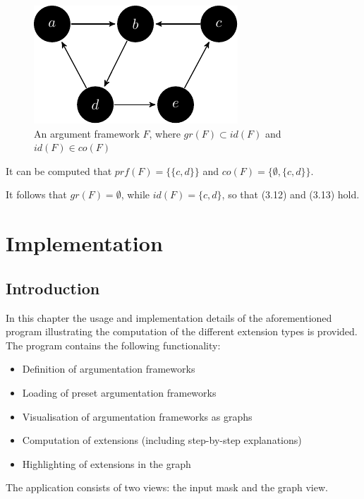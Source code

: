 \documentclass[draft,final]{vutinfth} %
\newcommand{\hl}{\par\vspace{6pt}} %
\newcommand{\cl}{\par\vspace{12pt}} %
\begin{document}
\FloatBarrier
	\begin{figure}[!h]
		\centering
		\includegraphics[scale=1.5]{graphs/ex6.pdf}
		\caption{An argument framework $F$, where $gr(F)\subset id(F)$ and $id(F)\in co(F)$}
	\end{figure}
\FloatBarrier

It can be computed that $prf(F)=\{\{c,d\}\}$ and $co(F)=\{\emptyset,\{c,d\}\}$.\hl
It follows that $gr(F)=\emptyset$, while $id(F)=\{c,d\}$, so that (3.12) and (3.13) hold.\cl


\chapter{Implementation}

\section{Introduction}
In this chapter the usage and implementation details of the aforementioned program illustrating the computation of the different extension types is provided. The program contains the following functionality:\hl

\begin{itemize}
\item Definition of argumentation frameworks
\item Loading of preset argumentation frameworks
\item Visualisation of argumentation frameworks as graphs
\item Computation of extensions (including step-by-step explanations)
\item Highlighting of extensions in the graph
\end{itemize}

The application consists of two views: the input mask and the graph view.
\end{document}
